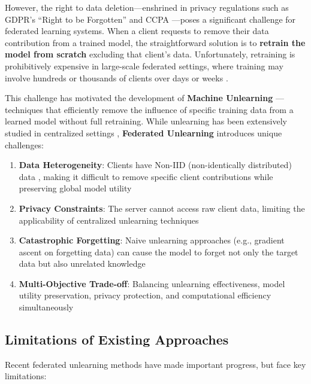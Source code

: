 \documentclass[10pt,twocolumn]{article}
\begin{document}
However, the right to data deletion---enshrined in privacy regulations such as GDPR's ``Right to be Forgotten'' \cite{gdpr2018} and CCPA \cite{ccpa2020}---poses a significant challenge for federated learning systems. When a client requests to remove their data contribution from a trained model, the straightforward solution is to \textbf{retrain the model from scratch} excluding that client's data. Unfortunately, retraining is prohibitively expensive in large-scale federated settings, where training may involve hundreds or thousands of clients over days or weeks \cite{yang2019federated,bonawitz2019towards}.

This challenge has motivated the development of \textbf{Machine Unlearning} \cite{cao2015towards,bourtoule2021machine}---techniques that efficiently remove the influence of specific training data from a learned model without full retraining. While unlearning has been extensively studied in centralized settings \cite{golatkar2020eternal,tarun2021fast,guo2020certified,thudi2022necessity}, \textbf{Federated Unlearning} introduces unique challenges:

\begin{enumerate}
\item \textbf{Data Heterogeneity}: Clients have Non-IID (non-identically distributed) data \cite{zhao2018federated,hsu2019measuring}, making it difficult to remove specific client contributions while preserving global model utility
\item \textbf{Privacy Constraints}: The server cannot access raw client data, limiting the applicability of centralized unlearning techniques
\item \textbf{Catastrophic Forgetting}: Naive unlearning approaches (e.g., gradient ascent on forgetting data) can cause the model to forget not only the target data but also unrelated knowledge
\item \textbf{Multi-Objective Trade-off}: Balancing unlearning effectiveness, model utility preservation, privacy protection, and computational efficiency simultaneously
\end{enumerate}

\subsection{Limitations of Existing Approaches}

Recent federated unlearning methods \cite{liu2021federaser,wu2023federated,ferrari2024efficient,gao2022verifi} have made important progress, but face key limitations:
\end{document}
